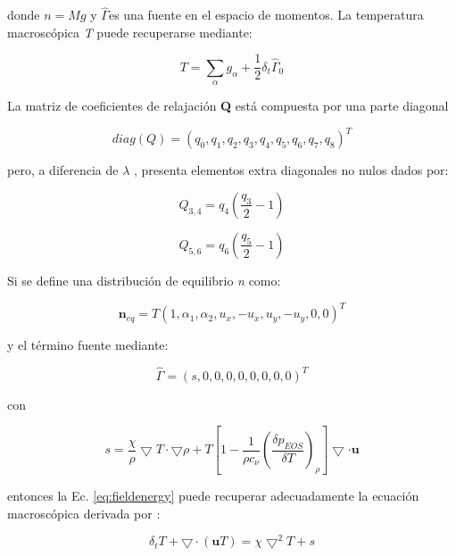 donde $n = M g$ y $\hat{\Gamma}$es una fuente en el espacio de momentos. La temperatura macroscópica \textit{T} puede recuperarse mediante:

\begin{equation}
    T = \sum_{\alpha} g_{\alpha} + \frac{1}{2} \delta_{t} {\hat{\Gamma}}_{0}
\end{equation}

La matriz de coeficientes de relajación \textbf{Q} está compuesta por una parte diagonal

\begin{equation}
    \textit{diag} (Q) = {( q_{0} , q_{1} , q_{2} , q_{3} , q_{4} , q_{5} , q_{6} , q_{7} , q_{8} )}^{T}
\end{equation}

pero, a diferencia de $\lambda$ , presenta elementos extra diagonales no nulos dados por:

\begin{equation}
    Q_{3,4} = q_{4} \left( \frac{q_{3}}{2} - 1 \right)
\end{equation}

\begin{equation}
    Q_{5,6} = q_{6} \left( \frac{q_{5}}{2} - 1 \right)
\end{equation}

Si se define una distribución de equilibrio \textit{n} como:

\begin{equation}
    {\mathbf{n}}_{eq} = T { \left( 1, \alpha_{1}, \alpha_{2}, u_{x}, -u_{x}, u_{y}, -u_{y}, 0, 0 \right) }^{T}
\end{equation}

y el término fuente mediante:

\begin{equation}
    \hat{\Gamma} = {( s, 0, 0, 0, 0, 0, 0, 0, 0 )}^{T}
\end{equation}

con 

\begin{equation}
    s = \frac{\chi}{\rho} \bigtriangledown T \cdot \bigtriangledown \rho + T \left[ 1 - \frac{1}{\rho c_{\nu}} {\left( \frac{\delta p_{EOS}}{\delta T} \right)}_{\rho} \right] \bigtriangledown \cdot \mathbf{u}
\end{equation}

entonces la Ec. \ref{eq:fieldenergy} puede recuperar adecuadamente la ecuación macroscópica derivada por \cite{markus2011simulation}:

\begin{equation}
    \delta_{t} T + \bigtriangledown \cdot ( \mathbf{u} T ) = \chi {\bigtriangledown }^{2} T + s
\end{equation}

